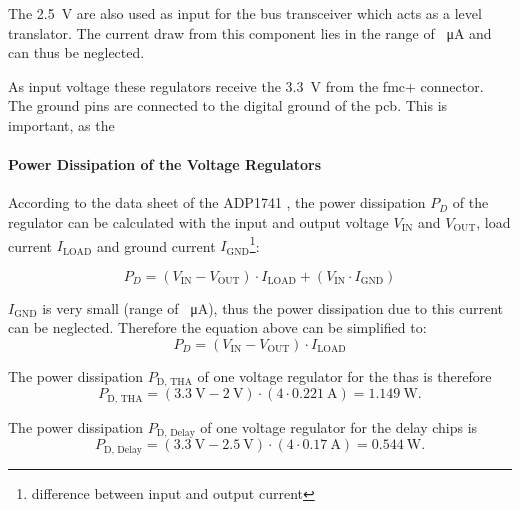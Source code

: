 The \SI{2.5}{\volt} are also used as input for the bus transceiver which acts as a level translator. 
The current draw from this component lies in the range of \SI{}{\micro \ampere} and can thus be neglected.

As input voltage these regulators receive the \SI{3.3}{\volt} from the \gls{fmc}+ connector.
The ground pins are connected to the digital ground of the \gls{pcb}.
This is important, as the 

\paragraph{Power Dissipation of the Voltage Regulators}
According to the data sheet of the ADP1741 \cite{adp1741}, the power dissipation $P_D$ of the regulator can be calculated with the input and output voltage $V_\text{IN}$ and $V_\text{OUT}$, load current $I_\text{LOAD}$ and ground current $I_\text{GND}$\footnote{difference between input and output current}:

\begin{equation}
	P_D = (V_\text{IN} - V_\text{OUT}) \cdot I_\text{LOAD} + (V_\text{IN} \cdot I_\text{GND})
\end{equation}

$I_\text{GND}$ is very small (range of \SI{}{\micro \ampere}), thus the power dissipation due to this current can be neglected.
Therefore the equation above can be simplified to:
\begin{equation}
	P_D = (V_\text{IN} - V_\text{OUT}) \cdot I_\text{LOAD}
\end{equation}

The power dissipation $P_\text{D, THA}$ of one voltage regulator for the \glspl{tha} is therefore
\begin{equation}
	P_\text{D, THA} = (\SI{3.3}{\volt} - \SI{2}{\volt}) \cdot (4 \cdot \SI{0.221}{\ampere}) = \SI{1.149}{\watt}.
\end{equation}

The power dissipation $P_\text{D, Delay}$ of one voltage regulator for the delay chips is 
\begin{equation}
	P_\text{D, Delay} = (\SI{3.3}{\volt} - \SI{2.5}{\volt}) \cdot (4 \cdot \SI{0.17}{\ampere}) = \SI{0.544}{\watt}.
\end{equation}


